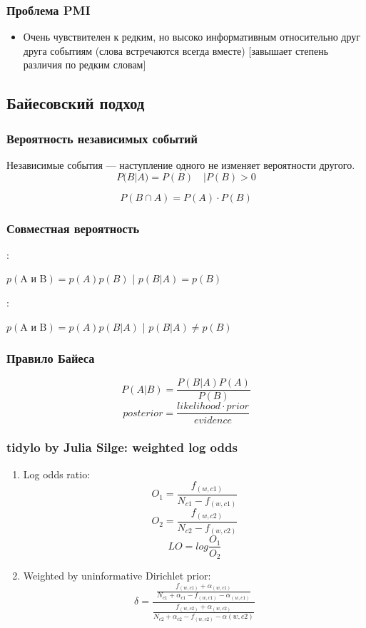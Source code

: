 \documentclass[svgnames]{beamer}
\begin{document}
\begin{frame}
  \frametitle{Проблема PMI}
  \begin{itemize}
  \item Очень чувствителен к редким, но высоко информативным
    относительно друг друга событиям (слова встречаются всегда вместе)
    [завышает степень различия по редким словам]
  \end{itemize}
\end{frame}

\subsection{Байесовский подход}

\begin{frame}
  \frametitle{Вероятность независимых событий}
  Независимые события — наступление одного не изменяет вероятности
  другого.
  \begin{equation}
    P(B|A) = P(B) \quad | P(B) > 0
  \end{equation}

  \begin{equation}
    P(B \cap A) = P(A) \cdot P(B)
  \end{equation}
\end{frame}

\begin{frame}
  \frametitle{Совместная вероятность}
  :

    $p(\text{A и B}) = p(A)p(B)$ \quad{} | $p(B|A) = p(B)$

    \bigskip

  \pause
  :

   $p(\text{A и B}) = p(A)p(B|A)$ \quad{} | $p(B|A) \neq p(B)$
\end{frame}

\begin{frame}
  \frametitle{Правило Байеса}
  \begin{equation}
    P(A|B) = \frac{P(B|A)P(A)}{P(B)}
  \end{equation}
  \pause
  \begin{equation}
    posterior = \frac{likelihood \cdot prior}{evidence}
  \end{equation}  
\end{frame}


\begin{frame}
  \frametitle{tidylo by Julia Silge: weighted log odds}
  \begin{enumerate}
  \item Log odds ratio:
    $$
    O_1 = \frac{f_{(w,c1)}}{N_{c1}-f_{(w,c1)}}
    $$
    $$
    O_2 = \frac{f_{(w,c2)}}{N_{c2}-f_{(w,c2)}}
    $$
    $$
    LO = log \frac{O_1}{O_2}
    $$
  \item Weighted by uninformative Dirichlet prior:
    $$
    \delta =
    \frac{\frac{f_{(w,c1)}+\alpha_{(w,c1)}}{N_{c1}+\alpha_{c1}-f_{(w,c1)}-\alpha_{(w,c1)}}}{\frac{f_{(w,c2)}+\alpha_{(w,c2)}}{N_{c2}+\alpha_{c2}-f_{(w,c2)}-\alpha{(w,c2)}}}
    $$
  \end{enumerate}
\end{frame}
\end{document}
